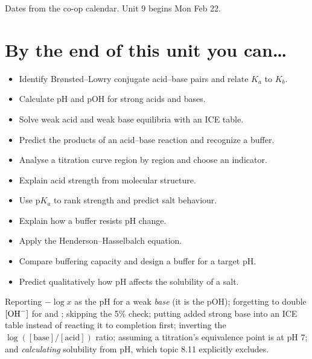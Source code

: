 \documentclass{apchem-worksheet}
\begin{document}
{\sffamily\footnotesize Dates from the co-op calendar. Unit 9 begins
Mon Feb 22.}

\vspace{0.4em}
\section*{\sffamily By the end of this unit you can\ldots}

\begin{itemize}[leftmargin=*,itemsep=0.1em]
  \item Identify Br\o nsted--Lowry conjugate acid--base pairs and relate
        $K_a$ to $K_b$. 
  \item Calculate pH and pOH for strong acids and bases. 
  \item Solve weak acid and weak base equilibria with an ICE table.
  \item Predict the products of an acid--base reaction and recognize a
        buffer. 
  \item Analyse a titration curve region by region and choose an indicator.
  \item Explain acid strength from molecular structure. 
  \item Use p$K_a$ to rank strength and predict salt behaviour. 
  \item Explain how a buffer resists pH change. 
  \item Apply the Henderson--Hasselbalch equation. 
  \item Compare buffering capacity and design a buffer for a target pH.
  \item Predict qualitatively how pH affects the solubility of a salt.
\end{itemize}

\begin{apctrap}
Reporting $-\log x$ as the pH for a weak \emph{base} (it is the pOH);
forgetting to double $[\ce{OH-}]$ for  and ;
skipping the 5\% check; putting added strong base into an ICE table instead
of reacting it to completion first; inverting the
$\log([\text{base}]/[\text{acid}])$ ratio; assuming a titration's
equivalence point is at pH 7; and \emph{calculating} solubility from pH,
which topic 8.11 explicitly excludes.
\end{apctrap}
\end{document}
